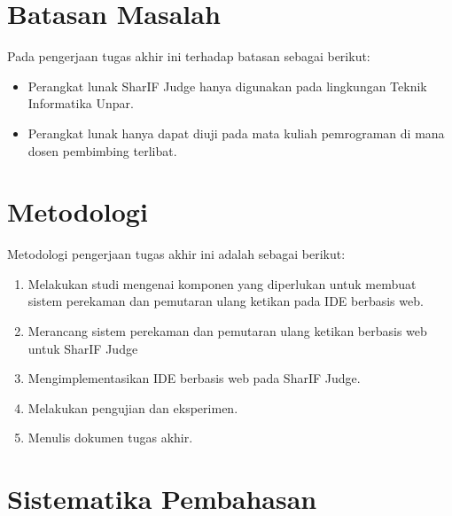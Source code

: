 \section{Batasan Masalah}
\label{sec:1:batasan}

Pada pengerjaan tugas akhir ini terhadap batasan sebagai berikut:
    \begin{itemize}
        \item Perangkat lunak SharIF Judge hanya digunakan pada lingkungan Teknik Informatika Unpar.
        \item Perangkat lunak hanya dapat diuji pada mata kuliah pemrograman di mana dosen pembimbing terlibat.
    \end{itemize}

\section{Metodologi}
\label{sec:1:metlit}

Metodologi pengerjaan tugas akhir ini adalah sebagai berikut:
    \begin{enumerate}
        \item Melakukan studi mengenai komponen yang diperlukan untuk membuat sistem perekaman dan pemutaran ulang ketikan pada IDE berbasis web.
        \item Merancang sistem perekaman dan pemutaran ulang ketikan berbasis web untuk SharIF Judge
        \item Mengimplementasikan IDE berbasis web pada SharIF Judge.
        \item Melakukan pengujian dan eksperimen.
        \item Menulis dokumen tugas akhir.
    \end{enumerate}

\section{Sistematika Pembahasan}
\label{sec:1:sispem}


